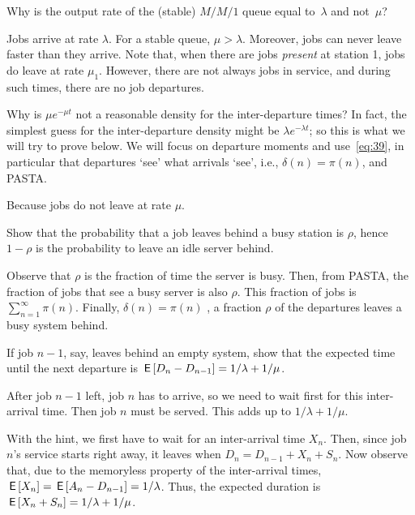 \begin{extra}
Why is the output rate of the (stable) $M/M/1$ queue equal to~$\lambda$ and not~$\mu$?
\begin{solution}
  Jobs arrive at rate $\lambda$.
  For a stable queue, $\mu>\lambda$.
  Moreover, jobs can never leave faster than they arrive.
  Note that, when there are jobs \emph{present} at station 1, jobs do leave at rate $\mu_1$.
  However, there are not always jobs in service, and during such times, there are no job departures.
\end{solution}
\end{extra}


\begin{extra}
 Why is $\mu e^{-\mu t}$ not a reasonable density for the inter-departure times?
 In fact, the simplest guess for the inter-departure density might be $\lambda e^{-\lambda t}$; so this is what we will try to prove below.
We will focus on departure moments and use~\cref{eq:39}, in particular that departures `see' what arrivals `see', i.e., $\delta(n)= \pi(n)$, and PASTA.
\begin{solution}
 Because jobs do not leave at rate $\mu$. 
\end{solution}
\end{extra}




\begin{extra}
Show that the probability that a job leaves behind a busy station is $\rho$, hence $1-\rho$ is the probability to leave an idle server behind.
\begin{solution}
Observe that $\rho$ is the fraction of time the server is busy. Then, from PASTA, the fraction of jobs that see a busy server is also $\rho$. This fraction of jobs is $\sum_{n=1}^\infty \pi(n)$. Finally, $\delta(n) = \pi(n)$ , a fraction $\rho$ of the departures leaves a busy system behind.

\end{solution}
\end{extra}


\begin{extra}
 If job $n-1$, say, leaves behind an empty system, show that the expected time until the next departure is $\,\mathsf{E}\left[D_n - D_{n-1}\right] = 1/\lambda + 1/\mu$. 
\begin{hint}
 After job $n-1$ left, job $n$ has to arrive, so we need to wait first for this inter-arrival time. Then job $n$ must be served. This adds up to $1/\lambda + 1/\mu$. 
\end{hint}
\begin{solution}
With the hint, we first have to wait for an inter-arrival
 time $X_n$. Then, since job $n$'s service starts right away, it
 leaves when $D_n = D_{n-1}+X_n + S_n$. Now observe that, due to the memoryless property of the inter-arrival times, $\,\mathsf{E}\left[X_n\right] = \,\mathsf{E}\left[A_n - D_{n-1}\right] = 1/\lambda$. Thus, the expected duration is $\,\mathsf{E}\left[X_n + S_n\right]=1/\lambda + 1/\mu$. 
\end{solution}
\end{extra}

